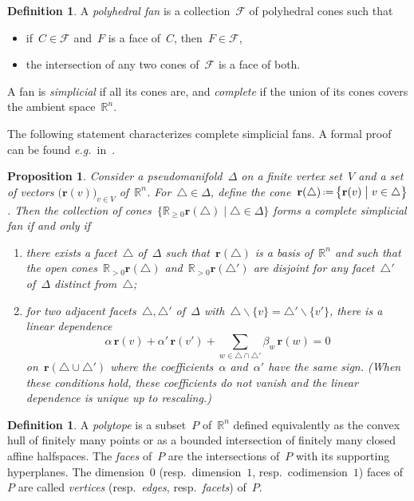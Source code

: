 \documentclass{amsart}
\newtheorem{proposition}[theorem]{Proposition}
\theoremstyle{definition}
\newtheorem{definition}[theorem]{Definition}
\newcommand{\R}{\mathbb{R}} %
\renewcommand{\b}[1]{\mathbf{#1}} %
\newcommand{\bigset}[2]{\big\{ #1 \;\big|\; #2 \big\}} %
\newcommand{\ssm}{\smallsetminus} %
\newcommand{\eqdef}{\mbox{\,\raisebox{0.2ex}{\scriptsize\ensuremath{\mathrm:}}\ensuremath{=}\,}} %
\newcommand{\eg}{\textit{e.g.}~} %
\newcommand{\darkblue}{\color{darkblue}} %
\newcommand{\defn}[1]{\textsl{\darkblue #1}} %
\newcommand{\Fan}{\mathcal{F}} %
\begin{document}
\begin{definition}
A \defn{polyhedral fan} is a collection~$\Fan$ of polyhedral cones such that
\begin{itemize}
\item if~$C \in \Fan$ and~$F$ is a face of~$C$, then~$F \in \Fan$,
\item the intersection of any two cones of~$\Fan$ is a face of both.
\end{itemize}
A fan is \defn{simplicial} if all its cones are, and \defn{complete} if the union of its cones covers the ambient space~$\R^n$.
\end{definition}

The following statement characterizes complete simplicial fans.
A formal proof can be found \eg in~\cite[Coro.~4.5.20]{DeLoeraRambauSantos}.

\begin{proposition}
\label{prop:characterizationFan}
Consider a pseudomanifold~$\Delta$ on a finite vertex set~$V$ and a set of vectors $\big( \b{r}(v) \big)_{v \in V}$ of~$\R^n$.
For~$\triangle \in \Delta$, define the cone~$\b{r}(\triangle) \eqdef \bigset{\b{r}(v)}{v \in \triangle}$.
Then the collection of cones~${\bigset{\R_{\ge 0}\b{r}(\triangle)}{\triangle \in \Delta}}$ forms a complete simplicial fan if and only if
\begin{enumerate}
\item there exists a facet~$\triangle$ of~$\Delta$ such that~$\b{r}(\triangle)$ is a basis of~$\R^n$ and such that the open cones~$\R_{> 0}\b{r}(\triangle)$ and~$\R_{> 0}\b{r}(\triangle')$ are disjoint for any facet~$\triangle'$ of~$\Delta$ distinct from~$\triangle$;
\item for two adjacent facets~$\triangle, \triangle'$ of~$\Delta$ with~$\triangle \ssm \{v\} = \triangle' \ssm \{v'\}$, there is a linear dependence
\[
\alpha \, \b{r}(v) + \alpha' \, \b{r}(v') + \sum_{w \in \triangle \cap \triangle'} \beta_w \, \b{r}(w) = 0
\]
on~$\b{r}(\triangle \cup \triangle')$ where the coefficients~$\alpha$ and~$\alpha'$ have the same sign.
(When these conditions hold, these coefficients do not vanish and the linear dependence is unique up to rescaling.)
\end{enumerate}
\end{proposition}

\begin{definition}
A \defn{polytope} is a subset~$P$ of~$\R^n$ defined equivalently as the convex hull of finitely many points or as a bounded intersection of finitely many closed affine halfspaces.
The \defn{faces} of~$P$ are the intersections of~$P$ with its supporting hyperplanes.
The dimension~$0$ (resp.~dimension~$1$, resp.~codimension~$1$) faces of~$P$ are called \defn{vertices} (resp.~\defn{edges}, resp.~\defn{facets}) of~$P$.
\end{definition}
\end{document}
